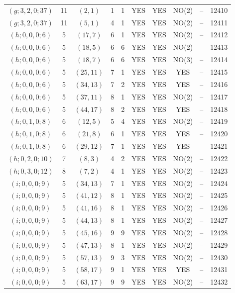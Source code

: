 \begin{longtable}{|c|c|c|c|c|c|c|c|c|c|}
$(g; 3, 2, 0; 37)$ & 11 & $(2, 1)$ & 1 & 1 & YES & YES & NO(2) & -- & 12410\\
$(g; 3, 2, 0; 37)$ & 11 & $(5, 1)$ & 4 & 1 & YES & YES & NO(2) & -- & 12411\\
$(h; 0, 0, 0; 6)$ & 5 & $(17, 7)$ & 6 & 1 & YES & YES & NO(2) & -- & 12412\\
$(h; 0, 0, 0; 6)$ & 5 & $(18, 5)$ & 6 & 6 & YES & YES & NO(2) & -- & 12413\\
$(h; 0, 0, 0; 6)$ & 5 & $(18, 7)$ & 6 & 6 & YES & YES & NO(3) & -- & 12414\\
$(h; 0, 0, 0; 6)$ & 5 & $(25, 11)$ & 7 & 1 & YES & YES & YES & -- & 12415\\
$(h; 0, 0, 0; 6)$ & 5 & $(34, 13)$ & 7 & 2 & YES & YES & YES & -- & 12416\\
$(h; 0, 0, 0; 6)$ & 5 & $(37, 11)$ & 8 & 1 & YES & YES & NO(2) & -- & 12417\\
$(h; 0, 0, 0; 6)$ & 5 & $(44, 17)$ & 8 & 2 & YES & YES & YES & -- & 12418\\
$(h; 0, 1, 0; 8)$ & 6 & $(12, 5)$ & 5 & 4 & YES & YES & NO(2) & -- & 12419\\
$(h; 0, 1, 0; 8)$ & 6 & $(21, 8)$ & 6 & 1 & YES & YES & YES & -- & 12420\\
$(h; 0, 1, 0; 8)$ & 6 & $(29, 12)$ & 7 & 1 & YES & YES & YES & -- & 12421\\
$(h; 0, 2, 0; 10)$ & 7 & $(8, 3)$ & 4 & 2 & YES & YES & NO(2) & -- & 12422\\
$(h; 0, 3, 0; 12)$ & 8 & $(7, 2)$ & 4 & 1 & YES & YES & NO(2) & -- & 12423\\
$(i; 0, 0, 0; 9)$ & 5 & $(34, 13)$ & 7 & 1 & YES & YES & NO(2) & -- & 12424\\
$(i; 0, 0, 0; 9)$ & 5 & $(41, 12)$ & 8 & 1 & YES & YES & NO(2) & -- & 12425\\
$(i; 0, 0, 0; 9)$ & 5 & $(41, 16)$ & 8 & 1 & YES & YES & NO(2) & -- & 12426\\
$(i; 0, 0, 0; 9)$ & 5 & $(44, 13)$ & 8 & 1 & YES & YES & NO(2) & -- & 12427\\
$(i; 0, 0, 0; 9)$ & 5 & $(45, 16)$ & 9 & 9 & YES & YES & NO(2) & -- & 12428\\
$(i; 0, 0, 0; 9)$ & 5 & $(47, 13)$ & 8 & 1 & YES & YES & NO(2) & -- & 12429\\
$(i; 0, 0, 0; 9)$ & 5 & $(57, 13)$ & 9 & 3 & YES & YES & NO(2) & -- & 12430\\
$(i; 0, 0, 0; 9)$ & 5 & $(58, 17)$ & 9 & 1 & YES & YES & YES & -- & 12431\\
$(i; 0, 0, 0; 9)$ & 5 & $(63, 17)$ & 9 & 9 & YES & YES & NO(2) & -- & 12432\\

\end{longtable}
